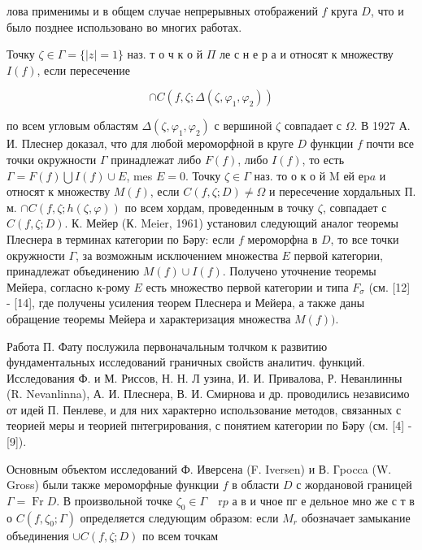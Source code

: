 \documentclass[10pt]{article}
\begin{document}
лова применимы и в общем случае непрерывных отображений $f$ круга $D$, что и было позднее использовано во многих работах.



Точку $\zeta \in \Gamma=\{|z|=1\}$ наз. т о ч к о й $\Pi$ ле с н е р а и относят к множеству $I(f)$, если пересечение



\[

\cap C\left(f, \zeta ; \Delta\left(\zeta, \varphi_{1}, \varphi_{2}\right)\right)

\]



по всем угловым областям $\Delta\left(\zeta, \varphi_{1}, \varphi_{2}\right)$ с вершиной $\zeta$ совпадает с $\Omega$. В 1927 А. И. Плеснер доказал, что для любой мероморфной в круге $D$ функции $f$ почти все точки окружности $\Gamma$ принадлежат либо $F(f)$, либо $I(f)$, то есть $\Gamma=F(f) \bigcup I(f) \cup E$, mes $E=0$. Точку $\zeta \in \Gamma$ наз. то о к о й $\mathrm{M}$ ей $е \mathrm{p} a$ и относят к множеству $M(f)$, если $C(f, \zeta ; D) \neq \Omega$ и пересечение хордальных П. м. $\cap C(f, \zeta ; h(\zeta, \varphi))$ по всем хордам, проведенным в точку $\zeta$, совпадает с $C(f, \zeta ; D)$. К. Мейер (К. Meier, 1961) установил следующий аналог теоремы Плеснера в терминах категории по Бәру: если $f$ мероморфна в $D$, то все точки окружности $\Gamma$, за возможным исключением множества $E$ первой категории, принадлежат объединению $M(f) \cup I(f)$. Получено уточнение теоремы Мейера, согласно к-рому $E$ есть множество первой категории и типа $F_{\sigma}$ (см. [12] - [14], где получены усиления теорем Плеснера и Мейера, а также даны обращение теоремы Мейера и характеризация множества $M(f))$.



Работа П. Фату послужила первоначальным толчком к развитию фундаментальных исследований граничных свойств аналитич. функций. Исследования Ф. и М. Риссов, Н. Н. Л узина, И. И. Привалова, Р. Неванлинны (R. Nevanlinna), А. И. Плеснера, В. И. Смирнова и др. проводились независимо от идей П. Пенлеве, и для них характерно использование методов, связанных с теорией меры и теорией пнтегрирования, с понятием категории по Бәру (см. [4] - [9]).



Основным объектом исследований Ф. Иверсена (F. Iversen) и В. Гpocca (W. Gross) были также мероморфные функции $f$ в области $D$ с жордановой границей $\Gamma=\operatorname{Fr} D$. В произвольной точке $\zeta_{0} \in \Gamma \quad \mathrm{r} p$ а в и чное пг е дельное мно же с т в о $C\left(f, \zeta_{0} ; \Gamma\right)$ определяется следующим образом: если $M_{r}$ обозначает замыкание объединения $\cup C(f, \zeta ; D)$ по всем точкам
\end{document}
